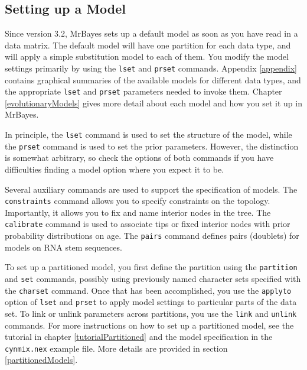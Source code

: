 \documentclass[12pt]{book}
\newcommand{\ttt}[1]{\texttt{#1} }
\begin{document}
\subsection{Setting up a Model}

Since version 3.2, MrBayes sets up a default model as soon as you have read in a data matrix. The default
model will have one partition for each data type, and will apply a simple substitution model to each of them.
You modify the model settings primarily by using the \ttt{lset} and \ttt{prset} commands. Appendix \ref{appendix}
contains graphical summaries of the available models for different data types, and the appropriate \ttt{lset}
and \ttt{prset} parameters needed to invoke them. Chapter \ref{evolutionaryModels} gives more
detail about each model and how you set it up in MrBayes.

In principle, the \ttt{lset} command is used to set the structure of the model, while the \ttt{prset} command is
used to set the prior parameters. However, the distinction is somewhat arbitrary, so check the options of both
commands if you have difficulties finding a model option where you expect it to be.

Several auxiliary commands are used to support the specification of models. The \ttt{constraints} command allows
you to specify constraints on the topology. Importantly, it allows you to fix and name interior nodes in the tree.
The \ttt{calibrate} command is used to associate tips or fixed interior nodes with prior probability distributions
on age. The \ttt{pairs} command defines pairs (doublets) for models on RNA stem sequences.

To set up a partitioned model, you first define the partition using the \ttt{partition} and \ttt{set} commands,
possibly using previously named character sets specified with the \ttt{charset} command. Once that has been
accomplished, you use the \ttt{applyto} option of \ttt{lset} and \ttt{prset} to apply model
settings to particular parts of the data set. To link or unlink parameters across partitions, you use the
\ttt{link} and \ttt{unlink} commands. For more instructions on how to set up a partitioned model, see the tutorial
in chapter \ref{tutorialPartitioned} and the model specification in the \ttt{cynmix.nex} example file. More details
are provided in section \ref{partitionedModels}.
\end{document}
